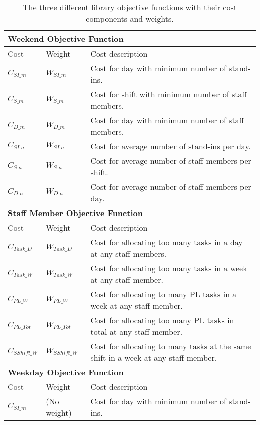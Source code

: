 \begin{table}[!h]
\centering
\caption{The three different library objective functions with their cost components and weights.}
\label{tab:lib_costs}
\begin{tabular}{|l|l|p{7cm}|}
\hline
\multicolumn{3}{|l|}{\cellcolor{gray!90} \textbf{Weekend Objective Function}} \\
\hline 
\rowcolor{Gray} Cost & Weight & Cost description \\ \hline
$C_{SI\_m}$ & $W_{SI\_m}$ & Cost for day with minimum number of stand-ins. \\ \hline
$C_{S\_m}$ & $W_{S\_m}$ & Cost for shift with minimum number of staff members. \\ \hline
$C_{D\_m}$ & $W_{D\_m}$ & Cost for day with minimum number of staff members. \\ \hline
$C_{SI\_a}$ & $W_{SI\_a}$ & Cost for average number of stand-ins per day. \\ \hline
$C_{S\_a}$ & $W_{S\_a}$ & Cost for average number of staff members per shift. \\ \hline
$C_{D\_a}$ & $W_{D\_a}$ & Cost for average number of staff members per day. \\ \hline
\hline
\multicolumn{3}{|l|}{\cellcolor{gray!90} \textbf{Staff Member Objective Function}} \\
\hline
\rowcolor{Gray} Cost & Weight & Cost description \\ \hline
$C_{Task\_D}$ & $W_{Task\_D}$ & Cost for allocating too many tasks in a day at any staff members. \\ \hline
$C_{Task\_W}$ & $W_{Task\_W}$ & Cost for allocating too many tasks in a week at any staff member. \\ \hline
$C_{PL\_W}$ & $W_{PL\_W}$ & Cost for allocating to many PL tasks in a week at any staff member. \\ \hline
$C_{PL\_Tot}$ & $W_{PL\_Tot}$ & Cost for allocating too many PL tasks in total at any staff member. \\ \hline
$C_{SShift\_W}$ & $W_{SShift\_W}$ & Cost for allocating to many tasks at the same shift in a week at any staff member. \\ \hline
\hline
 \multicolumn{3}{|l|}{\cellcolor{gray!90} \textbf{Weekday Objective Function}} \\
\hline
\rowcolor{Gray} Cost & Weight & Cost description \\ \hline
$C_{SI\_m}$ & (No weight) & Cost for day with minimum number of stand-ins. \\ \hline
\end{tabular}
\end{table}

